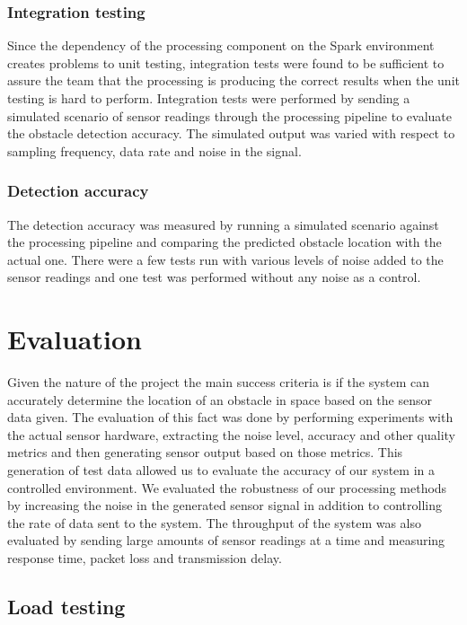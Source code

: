 \documentclass[prodmode,acmtosem]{acmsmall} %
\begin{document}
\subsubsection{Integration testing}
Since the dependency of the processing component on the Spark environment creates  problems to unit testing, integration tests were found to be sufficient to assure the team that the processing is producing the correct results when the unit testing is hard to perform. Integration tests were performed by sending a simulated scenario of sensor readings through the processing pipeline to evaluate the obstacle detection accuracy. The simulated output was varied with respect to sampling frequency, data rate and noise in the signal.

\subsubsection{Detection accuracy}
The detection accuracy was measured by running a simulated scenario against the processing pipeline and comparing the predicted obstacle location with the actual one. There were a few tests run with various levels of noise added to the sensor readings and one test was performed without any noise as a control.

\section{Evaluation}
Given the nature of the project the main success criteria is if the system can accurately determine the location of an obstacle in space based on the sensor data given. The evaluation of this fact was done by performing experiments with the actual sensor hardware, extracting the noise level, accuracy and other quality metrics and then generating sensor output based on those metrics. This generation of test data allowed us to evaluate the accuracy of our system in a controlled environment. We evaluated the robustness of our processing methods by increasing the noise in the generated sensor signal in addition to controlling the rate of data sent to the system. The throughput of the system was also evaluated by sending large amounts of sensor readings at a time and measuring response time, packet loss and transmission delay.

\subsection{Load testing}
\end{document}
